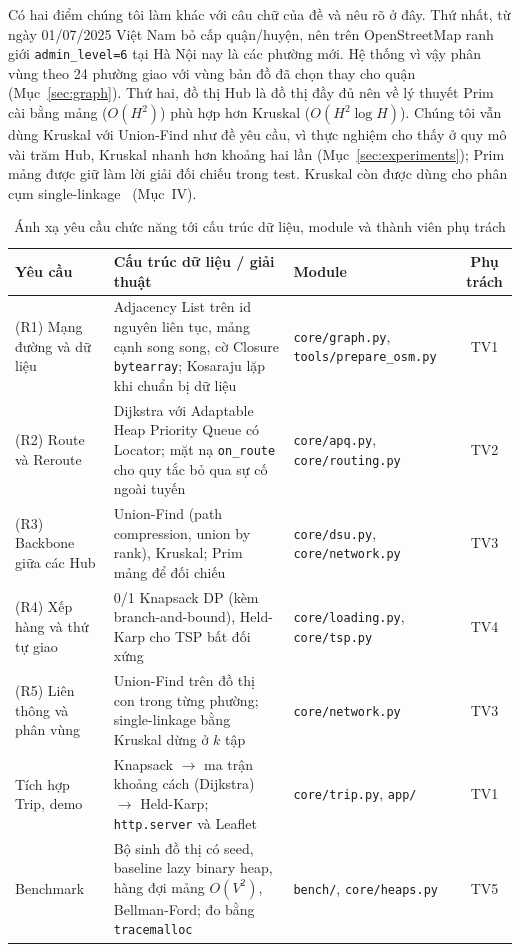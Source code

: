 Có hai điểm chúng tôi làm khác với câu chữ của đề và nêu rõ ở đây. Thứ nhất, từ ngày 01/07/2025 Việt Nam bỏ cấp quận/huyện, nên trên OpenStreetMap ranh giới \texttt{admin\_level=6} tại Hà Nội nay là các phường mới. Hệ thống vì vậy phân vùng theo 24 phường giao với vùng bản đồ đã chọn thay cho quận (Mục~\ref{sec:graph}). Thứ hai, đồ thị Hub là đồ thị đầy đủ nên về lý thuyết Prim cài bằng mảng ($O(H^2)$) phù hợp hơn Kruskal ($O(H^2\log H)$). Chúng tôi vẫn dùng Kruskal với Union-Find như đề yêu cầu, vì thực nghiệm cho thấy ở quy mô vài trăm Hub, Kruskal nhanh hơn khoảng hai lần (Mục~\ref{sec:experiments}); Prim mảng được giữ làm lời giải đối chiếu trong test. Kruskal còn được dùng cho phân cụm single-linkage~\cite{gower1969} (Mục~IV).

\begin{table}[t]
\centering
\caption{Ánh xạ yêu cầu chức năng tới cấu trúc dữ liệu, module và thành viên phụ trách}
\label{tab:req}
\begin{tabular}{@{}p{}p{}p{}c@{}}
\toprule
Yêu cầu & Cấu trúc dữ liệu / giải thuật & Module & Phụ trách \\
\midrule
(R1) Mạng đường và dữ liệu & Adjacency List trên id nguyên liên tục, mảng cạnh song song, cờ Closure \texttt{bytearray}; Kosaraju lặp khi chuẩn bị dữ liệu & \texttt{core/graph.py}, \texttt{tools/prepare\_osm.py} & TV1 \\
(R2) Route và Reroute & Dijkstra với Adaptable Heap Priority Queue có Locator; mặt nạ \texttt{on\_route} cho quy tắc bỏ qua sự cố ngoài tuyến & \texttt{core/apq.py}, \texttt{core/routing.py} & TV2 \\
(R3) Backbone giữa các Hub & Union-Find (path compression, union by rank), Kruskal; Prim mảng để đối chiếu & \texttt{core/dsu.py}, \texttt{core/network.py} & TV3 \\
(R4) Xếp hàng và thứ tự giao & 0/1 Knapsack DP (kèm branch-and-bound), Held-Karp cho TSP bất đối xứng & \texttt{core/loading.py}, \texttt{core/tsp.py} & TV4 \\
(R5) Liên thông và phân vùng & Union-Find trên đồ thị con trong từng phường; single-linkage bằng Kruskal dừng ở $k$ tập & \texttt{core/network.py} & TV3 \\
Tích hợp Trip, demo & Knapsack $\rightarrow$ ma trận khoảng cách (Dijkstra) $\rightarrow$ Held-Karp; \texttt{http.server} và Leaflet & \texttt{core/trip.py}, \texttt{app/} & TV1 \\
Benchmark & Bộ sinh đồ thị có seed, baseline lazy binary heap, hàng đợi mảng $O(V^2)$, Bellman-Ford; đo bằng \texttt{tracemalloc} & \texttt{bench/}, \texttt{core/heaps.py} & TV5 \\
\bottomrule
\end{tabular}
\end{table}

